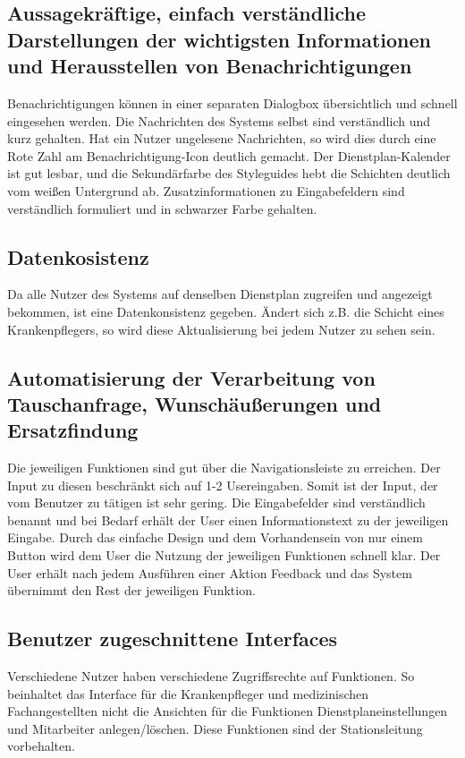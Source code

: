 \documentclass[11pt,
paper=a4,
bibtotocnumbered,	  %
liststotocnumbered,  %
DIV=calc,		  %
tablecaptionabove,	  %
headinclude,
]{article}
\begin{document}
\subsection{Aussagekräftige, einfach verständliche Darstellungen der wichtigsten Informationen und Herausstellen von Benachrichtigungen}
Benachrichtigungen können in einer separaten Dialogbox übersichtlich und schnell eingesehen werden. Die Nachrichten des Systems selbst sind verständlich und kurz gehalten.  Hat ein Nutzer ungelesene Nachrichten, so wird dies durch eine Rote Zahl am Benachrichtigung-Icon deutlich gemacht. Der Dienstplan-Kalender ist gut lesbar, und die Sekundärfarbe des Styleguides hebt die Schichten deutlich vom weißen Untergrund ab. Zusatzinformationen zu Eingabefeldern sind verständlich formuliert und in schwarzer Farbe gehalten.
\subsection{Datenkosistenz}
Da alle Nutzer des Systems auf denselben Dienstplan zugreifen und angezeigt bekommen, ist eine Datenkonsistenz gegeben. Ändert sich z.B. die Schicht eines Krankenpflegers, so wird diese Aktualisierung bei jedem Nutzer zu sehen sein.
\subsection{Automatisierung der Verarbeitung von Tauschanfrage, Wunschäußerungen und Ersatzfindung}
Die jeweiligen Funktionen sind gut über die Navigationsleiste zu erreichen. Der Input zu diesen beschränkt sich auf 1-2 Usereingaben. Somit ist der Input, der vom Benutzer zu tätigen ist sehr gering. Die Eingabefelder sind verständlich benannt und bei Bedarf erhält der User einen Informationstext zu der jeweiligen Eingabe. Durch das einfache Design und dem Vorhandensein von nur einem Button wird dem User die Nutzung der jeweiligen Funktionen schnell klar. Der User erhält nach jedem Ausführen einer Aktion Feedback und das System übernimmt den Rest der jeweiligen Funktion.
\subsection{Benutzer zugeschnittene Interfaces}
Verschiedene Nutzer haben verschiedene Zugriffsrechte auf Funktionen. So beinhaltet das Interface für die Krankenpfleger und medizinischen Fachangestellten nicht die Ansichten für die Funktionen Dienstplaneinstellungen und Mitarbeiter anlegen/löschen. Diese Funktionen sind der Stationsleitung vorbehalten.
\end{document}
